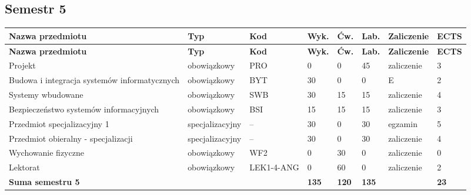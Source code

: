 \documentclass[12pt,a4paper]{article}
\newcommand{\thdrule}{\noalign{\global\setlength{\extrarowheight}{0pt}}}
\newcommand{\thdend}{\noalign{\global\setlength{\extrarowheight}{4pt}}}
\begin{document}
\clearpage
\subsection*{Semestr 5}

{\scriptsize
\begin{longtable}{>{\RaggedRight}m{5.0cm}m{1.9cm}m{0.75cm}m{0.85cm}m{0.85cm}m{0.85cm}m{1.45cm}m{0.9cm}}
\thdrule\toprule
\rowcolor{pjatkRed}
{\color{white}\footnotesize\textbf{\vphantom{Ag}Nazwa przedmiotu}} & {\color{white}\footnotesize\textbf{\vphantom{Ag}Typ}} & {\color{white}\footnotesize\textbf{\vphantom{Ag}Kod}} & {\color{white}\footnotesize\textbf{\vphantom{Ag}Wyk.}} & {\color{white}\footnotesize\textbf{\vphantom{Ag}Ćw.}} & {\color{white}\footnotesize\textbf{\vphantom{Ag}Lab.}} & {\color{white}\footnotesize\textbf{\vphantom{Ag}Zaliczenie}} & {\color{white}\footnotesize\textbf{\vphantom{Ag}ECTS}} \\
\midrule\thdend
\endfirsthead
\thdrule\toprule
\rowcolor{pjatkRed}
{\color{white}\footnotesize\textbf{\vphantom{Ag}Nazwa przedmiotu}} & {\color{white}\footnotesize\textbf{\vphantom{Ag}Typ}} & {\color{white}\footnotesize\textbf{\vphantom{Ag}Kod}} & {\color{white}\footnotesize\textbf{\vphantom{Ag}Wyk.}} & {\color{white}\footnotesize\textbf{\vphantom{Ag}Ćw.}} & {\color{white}\footnotesize\textbf{\vphantom{Ag}Lab.}} & {\color{white}\footnotesize\textbf{\vphantom{Ag}Zaliczenie}} & {\color{white}\footnotesize\textbf{\vphantom{Ag}ECTS}} \\
\midrule\thdend
\endhead
\rowcolor{tableRowLight} Projekt & {\scriptsize obowiązkowy} & PRO & 0 & 0 & 45 & {\scriptsize zaliczenie} & 3 \\
\rowcolor{tableRowAlt} Budowa i integracja systemów informatycznych & {\scriptsize obowiązkowy} & BYT & 30 & 0 & 0 & {\scriptsize E} & 2 \\
\rowcolor{tableRowLight} Systemy wbudowane & {\scriptsize obowiązkowy} & SWB & 30 & 15 & 15 & {\scriptsize zaliczenie} & 4 \\
\rowcolor{tableRowAlt} Bezpieczeństwo systemów informacyjnych & {\scriptsize obowiązkowy} & BSI & 15 & 15 & 15 & {\scriptsize zaliczenie} & 3 \\
\rowcolor{tableElective} Przedmiot specjalizacyjny 1 & {\scriptsize specjalizacyjny} & -- & 30 & 0 & 30 & {\scriptsize egzamin} & 5 \\
\rowcolor{tableElective} Przedmiot obieralny - specjalizacji & {\scriptsize specjalizacyjny} & -- & 30 & 0 & 30 & {\scriptsize zaliczenie} & 4 \\
\rowcolor{tableRowLight} Wychowanie fizyczne & {\scriptsize obowiązkowy} & WF2 & 0 & 30 & 0 & {\scriptsize zaliczenie} & 0 \\
\rowcolor{tableRowAlt} Lektorat & {\scriptsize obowiązkowy} & LEK1-4-ANG & 0 & 60 & 0 & {\scriptsize zaliczenie} & 2 \\
\midrule[\heavyrulewidth]
\rowcolor{tableSummary} \textbf{Suma semestru 5} & & & \textbf{135} & \textbf{120} & \textbf{135} & & \textbf{23} \\
\bottomrule
\end{longtable}}
\end{document}
